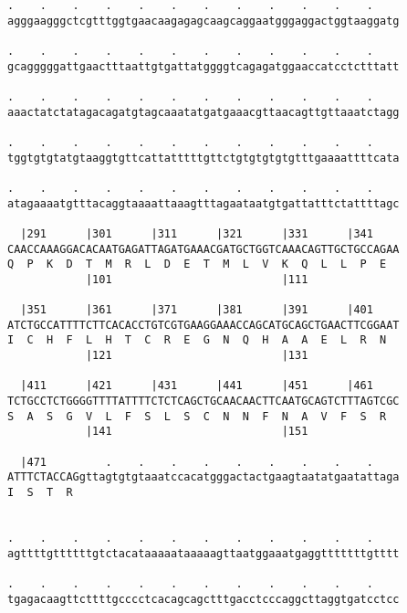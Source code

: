 \documentclass{article}
\begin{document}
\begin{Verbatim}
.    .    .    .    .    .    .    .    .    .    .    .    
agggaagggctcgtttggtgaacaagagagcaagcaggaatgggaggactggtaaggatg
                                                            
.    .    .    .    .    .    .    .    .    .    .    .    
gcagggggattgaactttaattgtgattatggggtcagagatggaaccatcctctttatt
                                                            
.    .    .    .    .    .    .    .    .    .    .    .    
aaactatctatagacagatgtagcaaatatgatgaaacgttaacagttgttaaatctagg
                                                            
.    .    .    .    .    .    .    .    .    .    .    .    
tggtgtgtatgtaaggtgttcattatttttgttctgtgtgtgtgtttgaaaattttcata
                                                            
.    .    .    .    .    .    .    .    .    .    .    .    
atagaaaatgtttacaggtaaaattaaagtttagaataatgtgattatttctattttagc
                                                            
  |291      |301      |311      |321      |331      |341    
CAACCAAAGGACACAATGAGATTAGATGAAACGATGCTGGTCAAACAGTTGCTGCCAGAA
Q  P  K  D  T  M  R  L  D  E  T  M  L  V  K  Q  L  L  P  E  
            |101                          |111              
  
  |351      |361      |371      |381      |391      |401    
ATCTGCCATTTTCTTCACACCTGTCGTGAAGGAAACCAGCATGCAGCTGAACTTCGGAAT
I  C  H  F  L  H  T  C  R  E  G  N  Q  H  A  A  E  L  R  N  
            |121                          |131              
  
  |411      |421      |431      |441      |451      |461    
TCTGCCTCTGGGGTTTTATTTTCTCTCAGCTGCAACAACTTCAATGCAGTCTTTAGTCGC
S  A  S  G  V  L  F  S  L  S  C  N  N  F  N  A  V  F  S  R  
            |141                          |151              
  
  |471         .    .    .    .    .    .    .    .    .    
ATTTCTACCAGgttagtgtgtaaatccacatgggactactgaagtaatatgaatattaga
I  S  T  R                                                  
                                                            
  
.    .    .    .    .    .    .    .    .    .    .    .    
agttttgttttttgtctacataaaaataaaaagttaatggaaatgaggtttttttgtttt
                                                            
.    .    .    .    .    .    .    .    .    .    .    .    
tgagacaagttcttttgcccctcacagcagctttgacctcccaggcttaggtgatcctcc
                                                            

\end{Verbatim}
\end{document}
